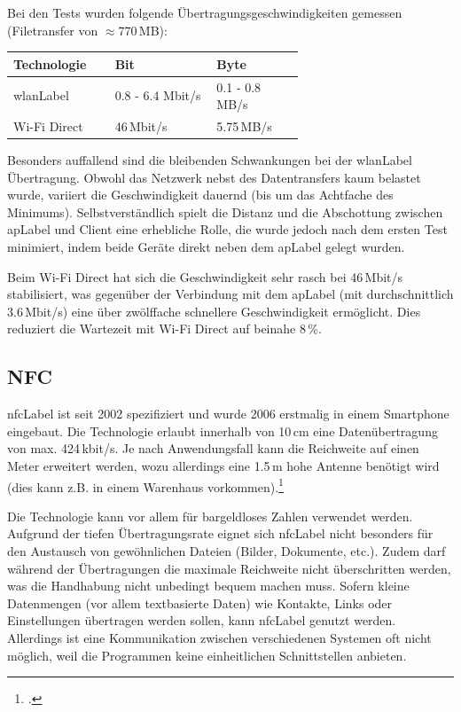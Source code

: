 Bei den Tests wurden folgende Übertragungsgeschwindigkeiten gemessen (Filetransfer von $\approx770$\,MB):
\begin{table}[H]
	\small\sffamily\renewcommand{\arraystretch}{1.4}
	\begin{tabular}{lp{0.35\linewidth}p{0.30\linewidth}}
		\toprule
		Technologie & Bit & Byte\\
		\midrule
		\gls{wlanLabel} & 0.8 - 6.4 Mbit/s & 0.1 - 0.8\,MB/s\\
		Wi-Fi Direct & 46\,Mbit/s & 5.75\,MB/s\\
		\bottomrule
	\end{tabular}
\end{table}

Besonders auffallend sind die bleibenden Schwankungen bei der \gls{wlanLabel} Übertragung.
Obwohl das Netzwerk nebst des Datentransfers kaum belastet wurde, variiert die Geschwindigkeit dauernd (bis um das Achtfache des Minimums).
Selbstverständlich spielt die Distanz und die Abschottung zwischen \gls{apLabel} und Client eine erhebliche Rolle, die wurde jedoch nach dem ersten Test minimiert, indem beide Geräte direkt neben dem \gls{apLabel} gelegt wurden.

Beim Wi-Fi Direct hat sich die Geschwindigkeit sehr rasch bei 46\,Mbit/s stabilisiert, was gegenüber der Verbindung mit dem \gls{apLabel} (mit durchschnittlich 3.6\,Mbit/s) eine über zwölffache schnellere Geschwindigkeit ermöglicht.
Dies reduziert die Wartezeit mit Wi-Fi Direct auf beinahe 8\,\%.

\subsection{NFC}
\gls{nfcLabel} ist seit 2002 spezifiziert und wurde 2006 erstmalig in einem Smartphone eingebaut.
Die Technologie erlaubt innerhalb von 10\,cm eine Datenübertragung von max. 424\,kbit/s.
Je nach Anwendungsfall kann die Reichweite auf einen Meter erweitert werden, wozu allerdings eine 1.5\,m hohe Antenne benötigt wird (dies kann z.B. in einem Warenhaus vorkommen).\footcite{Near_Field_Communication_Wikipedia_2015-05-22}

Die Technologie kann vor allem für bargeldloses Zahlen verwendet werden.
Aufgrund der tiefen Übertragungsrate eignet sich \gls{nfcLabel} nicht besonders für den Austausch von gewöhnlichen Dateien (Bilder, Dokumente, etc.).
Zudem darf während der Übertragungen die maximale Reichweite nicht überschritten werden, was die Handhabung nicht unbedingt bequem machen muss.
Sofern kleine Datenmengen (vor allem textbasierte Daten) wie Kontakte, Links oder Einstellungen übertragen werden sollen, kann \gls{nfcLabel} genutzt werden. Allerdings ist eine Kommunikation zwischen verschiedenen Systemen oft nicht möglich, weil die Programmen keine einheitlichen Schnittstellen anbieten.

